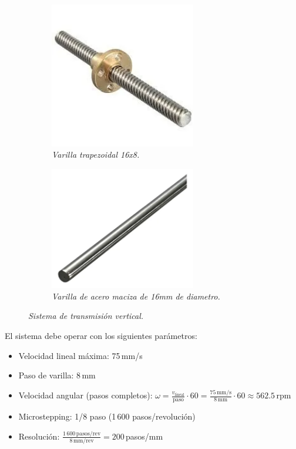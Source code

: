 \begin{figure}[H]
    \centering
    \begin{subfigure}{0.35\textwidth}
        \centering
        \includegraphics[width=0.7\textwidth]{img/v_roscada.png}
        \caption{\textit{Varilla trapezoidal 16x8.}}
        \label{fig:v_roscada}
    \end{subfigure}
    \hspace{0.5cm}
    \begin{subfigure}{0.35\textwidth}
        \centering
        \includegraphics[width=0.7\textwidth]{img/varilla lisa.png}
        \caption{\textit{Varilla de acero maciza de 16mm de diametro.}}
        \label{fig:varilla lisa}
    \end{subfigure}
    \caption{\textit{Sistema de transmisión vertical.}}
\end{figure}

El sistema debe operar con los siguientes parámetros:
\begin{itemize}[label=$\bullet$]
    \item Velocidad lineal máxima: 75\,mm/s
    \item Paso de varilla: 8\,mm
    \item Velocidad angular (pasos completos): $\omega = \frac{v_{\text{lineal}}}{\text{paso}} \cdot 60 = \frac{75\,\text{mm/s}}{8\,\text{mm}} \cdot 60 \approx 562.5$\,rpm
    \item Microstepping: 1/8 paso (1\,600 pasos/revolución)
    \item Resolución: $\frac{1\,600\,\text{pasos/rev}}{8\,\text{mm/rev}} = 200$\,pasos/mm
\end{itemize}

